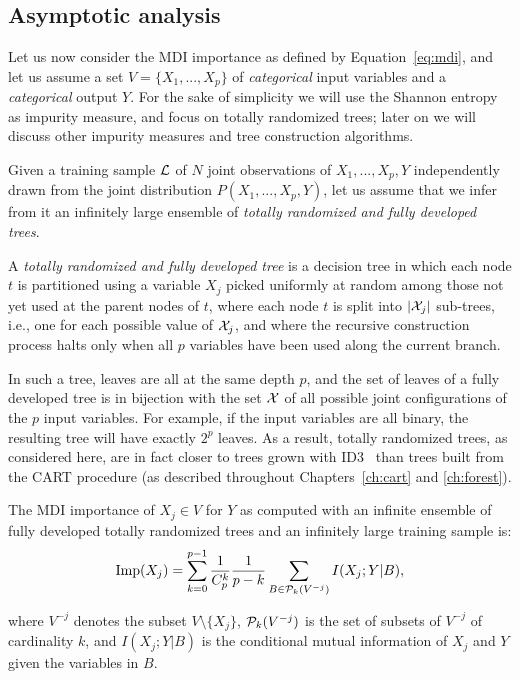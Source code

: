 \subsection{Asymptotic analysis}


Let us now consider the MDI  importance as defined by Equation~\ref{eq:mdi},
and let us assume a set $V= \{X_1, ..., X_p\}$\label{ntn:V}  of {\em categorical} input
variables and a {\em categorical} output $Y$. For the sake of simplicity we
will  use the Shannon entropy as impurity measure, and focus on totally
randomized trees; later on we will discuss other impurity measures and tree
construction algorithms.

Given a training sample ${\cal L}$ of $N$ joint observations of $X_1, ..., X_p,
Y$ independently drawn from the joint distribution $P(X_1, ..., X_p, Y)$, let us
assume that we infer from it an infinitely large ensemble of \textit{totally
randomized and fully developed trees}.

\begin{definition} A \emph{totally randomized and
fully developed tree} is a decision tree in which each node $t$ is
partitioned using a variable $X_j$ picked uniformly at random among those not
yet used at the parent nodes of $t$, where each node $t$ is split into $|{\cal
X}_j|$ sub-trees, i.e., one for each possible value of ${\cal X}_j$, and where
the recursive construction process halts only when all $p$ variables have been
used along the current branch.
\end{definition}

In such a tree, leaves are all at the same depth $p$, and the set of leaves of
a fully developed tree is in bijection with the set $\cal X$ of all possible
joint configurations of the $p$ input variables. For example, if the input
variables are all binary, the resulting tree will have exactly $2^{p}$ leaves.
As a result, totally randomized trees, as considered here, are in fact closer
to trees grown with ID3~\citep{quinlan:1986} than trees built from the CART
procedure (as described throughout Chapters~\ref{ch:cart} and \ref{ch:forest}).

\begin{theorem}\label{thm:imp}
The MDI importance of $X_j \in V$ for $Y$ as computed
with an   infinite ensemble of fully developed totally randomized trees and an
infinitely large training sample is:
  \begin{equation}\label{eqn:imp-full}
  \text{Imp}(X_j)=\sum_{k=0}^{p-1} \frac{1}{C_p^k} \frac{1}{p-k} \sum_{B \in {\cal P}_k(V^{-j})} I(X_j;Y|B),
  \end{equation}
\end{theorem}
\noindent where $V^{-j}$\label{ntn:V-j} denotes the subset $V \setminus \{X_j\}$, ${\cal
P}_k(V^{-j})$\label{ntn:P_k} is the set of subsets of  $V^{-j}$ of cardinality $k$, and
$I(X_j;Y|B)$ is the conditional mutual information of $X_{j}$ and $Y$ given the
variables in $B$\label{ntn:B}.

